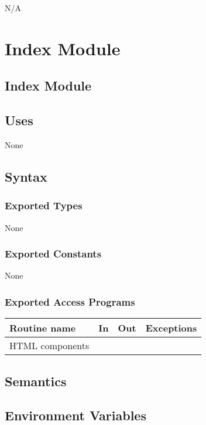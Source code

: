 \documentclass[12pt]{article}
\begin{document}
N/A

\newpage

\section {Index Module}

\subsection* {Index Module}

\subsection* {Uses}

None

\subsection* {Syntax}

\subsubsection* {Exported Types}

None

\subsubsection* {Exported Constants}

None

\subsubsection* {Exported Access Programs}
\begin{tabular}{| l | l | l | p{6cm} |}
\hline
\textbf{Routine name} & \textbf{In} & \textbf{Out} & \textbf{Exceptions}\\
\hline
HTML components & ~ & ~ &  \\
\hline
\end{tabular}


\subsection* {Semantics}

\subsection*{Environment Variables}
\end{document}
